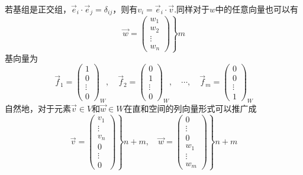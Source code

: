 \documentclass[a4paper,11pt]{article}
\begin{document}
    若基组是正交组，$\vec{e}_{i} \cdot \vec{e}_{j}=\delta_{i j}$，则有$v_i=\vec{e}_i\cdot\vec{v}$.同样对于$w$中的任意向量也可以有
    \begin{equation}
        \left.\vec{w}=\left(\begin{array}{c}
            w_{1} \\
            w_{2} \\
            \vdots \\
            w_{n}
            \end{array}\right)\right\} m
    \end{equation}
    基向量为
    \begin{equation}
        \vec{f}_{1}=\left(\begin{array}{c}
            1 \\
            0 \\
            \vdots \\
            0
            \end{array}\right)_{W}, \quad \vec{f}_{2}=\left(\begin{array}{c}
            0 \\
            1 \\
            \vdots \\
            0
            \end{array}\right)_{W}, \quad \cdots, \quad \vec{f}_{m}=\left(\begin{array}{c}
            0 \\
            0 \\
            \vdots \\
            1
            \end{array}\right)_{W}
    \end{equation}
    自然地，对于元素$\vec{v}\in V$和$\vec{w}\in W$在直和空间的列向量形式可以推广成
    \begin{equation}
        \left.\left.\vec{v}=\left(\begin{array}{c}
            v_{1} \\
            \vdots \\
            v_{n} \\
            \hline 0 \\
            \vdots \\
            0
            \end{array}\right)\right\} n+m, \quad \vec{w}=\left(\begin{array}{c}
            0 \\
            \vdots \\
            0 \\
            w_{1} \\
            \vdots \\
            w_{m}
            \end{array}\right)\right\} n+m
    \end{equation}
\end{document}
